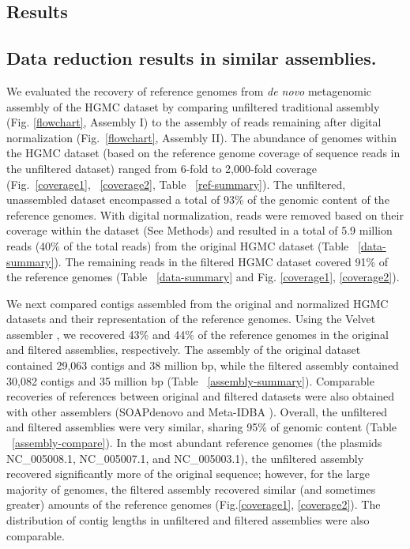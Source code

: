 \documentclass{pnastwo}
\begin{document}
\begin{article}
\section*{Results} \subsection*{Data reduction results in similar assemblies.} We
evaluated the recovery of reference genomes from {\em de novo} metagenomic
assembly of the HGMC dataset by comparing unfiltered traditional assembly (Fig.
\ref{flowchart}, Assembly I) to the assembly of reads remaining after digital
normalization (Fig.~\ref{flowchart}, Assembly II). The
abundance of genomes within the HGMC dataset (based on the reference genome
coverage of sequence reads in the unfiltered dataset) ranged from 6-fold to
2,000-fold coverage (Fig.~\ref{coverage1}, ~\ref{coverage2}, Table ~\ref{ref-summary}). The unfiltered, unassembled dataset
encompassed a total of 93\% of the genomic content of the reference genomes.
With digital normalization, reads were removed based on their coverage within
the dataset (See Methods) and resulted in a total of 5.9 million reads (40\% of
the total reads) from the original HGMC dataset (Table ~\ref{data-summary}). The
remaining reads in the filtered HGMC dataset covered 91\% of the reference
genomes (Table ~\ref{data-summary} and Fig. \ref{coverage1}, \ref{coverage2}).

We next compared contigs assembled from the original and normalized HGMC datasets
and their representation of the reference genomes. Using the Velvet assembler
\cite{Zerbino:2008p665}, we recovered 43\% and 44\% of the reference genomes in
the original and filtered assemblies, respectively. The assembly of the original
dataset contained 29,063 contigs and 38 million bp, while the filtered assembly
contained 30,082 contigs and 35 million bp (Table ~\ref{assembly-summary}).
Comparable recoveries of references between original and filtered datasets were
also obtained with other assemblers (SOAPdenovo \cite{Li:2010jz} and Meta-IDBA
\cite{Peng:2011p898}). Overall, the unfiltered and filtered assemblies were very
similar, sharing 95\% of genomic content (Table ~\ref{assembly-compare}). In the most abundant reference genomes
(the plasmids NC\_005008.1, NC\_005007.1, and NC\_005003.1), the unfiltered
assembly recovered significantly more of the original sequence; however, for the
large majority of genomes, the filtered assembly recovered similar (and sometimes
greater) amounts of the reference genomes (Fig.\ref{coverage1}, \ref{coverage2}). The distribution
of contig lengths in unfiltered and filtered assemblies were also comparable.


\end{article}
\end{document}
